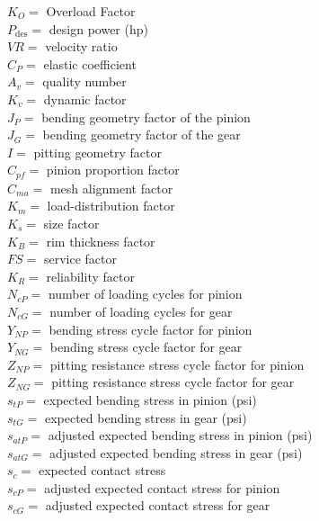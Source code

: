 \documentclass[11pt, fleqn]{article}
\begin{document}
$K_O=$ Overload Factor\\
$P_\text{des}=$ design power (hp)\\
$VR=$ velocity ratio\\
$C_P=$ elastic coefficient\\
$A_v=$ quality number\\
$K_v=$ dynamic factor\\
$J_P=$ bending geometry factor of the pinion\\
$J_G=$ bending geometry factor of the gear\\
$I=$ pitting geometry factor\\
$C_{pf}=$ pinion proportion factor\\
$C_{ma}=$ mesh alignment factor\\
$K_m=$ load-distribution factor\\
$K_s=$ size factor\\
$K_B=$ rim thickness factor\\
$FS=$ service factor\\
$K_R=$ reliability factor\\
$N_{cP}=$ number of loading cycles for pinion\\
$N_{cG}=$ number of loading cycles for gear\\
$Y_{NP}=$ bending stress cycle factor for pinion\\
$Y_{NG}=$ bending stress cycle factor for gear\\
$Z_{NP}=$ pitting resistance stress cycle factor for pinion\\
$Z_{NG}=$ pitting resistance stress cycle factor for gear\\
$s_{tP}=$ expected bending stress in pinion (psi)\\
$s_{tG}=$ expected bending stress in gear (psi)\\
$s_{atP}=$ adjusted expected bending stress in pinion (psi)\\
$s_{atG}=$ adjusted expected bending stress in gear (psi)\\
$s_c=$ expected contact stress\\
$s_{cP}=$ adjusted expected contact stress for pinion\\
$s_{cG}=$ adjusted expected contact stress for gear
\end{document}
